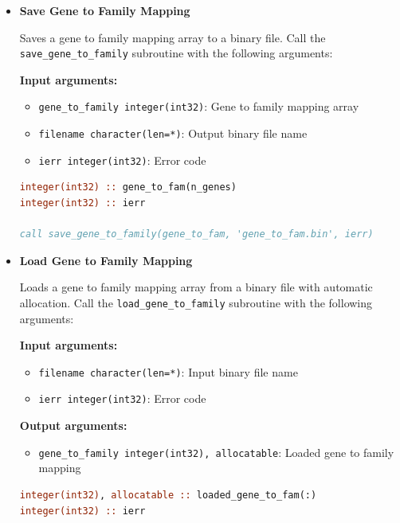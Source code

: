 \documentclass[11pt]{article}
\begin{document}
\begin{enumerate}
\begin{itemize}
\begin{lstlisting}[language=Fortran, caption={Load Expression Data}]
call load_expression_vectors(loaded_expr, 'expression.bin', ierr)
! loaded_expr automatically allocated as (samples x genes)
	      	      \end{lstlisting}
	      	      
	      	\item \textbf{Save Gene to Family Mapping}
	      	      
	      	      Saves a gene to family mapping array to a binary file. Call the
	      	      \texttt{save\_gene\_to\_family} subroutine with the following arguments:
	      	      
	      	      \textbf{Input arguments:}
	      	      \begin{itemize}
	      	      	\item \texttt{gene\_to\_family integer(int32)}: Gene to family mapping
	      	      	      array
	      	      	      
	      	      	\item \texttt{filename character(len=*)}: Output binary file name
	      	      	      
	      	      	\item \texttt{ierr integer(int32)}: Error code
	      	      \end{itemize}
	      	      \begin{lstlisting}[language=Fortran, caption={Save Gene-Family Mapping}]
integer(int32) :: gene_to_fam(n_genes)
integer(int32) :: ierr

call save_gene_to_family(gene_to_fam, 'gene_to_fam.bin', ierr)
	      	      \end{lstlisting}
	      	      
	      	\item \textbf{Load Gene to Family Mapping}
	      	      
	      	      Loads a gene to family mapping array from a binary file with automatic
	      	      allocation. Call the \texttt{load\_gene\_to\_family} subroutine with the
	      	      following arguments:
	      	      
	      	      \textbf{Input arguments:}
	      	      \begin{itemize}
	      	      	\item \texttt{filename character(len=*)}: Input binary file name
	      	      	      
	      	      	\item \texttt{ierr integer(int32)}: Error code
	      	      \end{itemize}
	      	      \textbf{Output arguments:}
	      	      \begin{itemize}
	      	      	\item \texttt{gene\_to\_family integer(int32), allocatable}: Loaded gene
	      	      	      to family mapping
	      	      \end{itemize}
	      	      \begin{lstlisting}[language=Fortran, caption={Load Gene-Family Mapping}]
integer(int32), allocatable :: loaded_gene_to_fam(:)
integer(int32) :: ierr


\end{lstlisting}
\end{itemize}
\end{enumerate}
\end{document}
